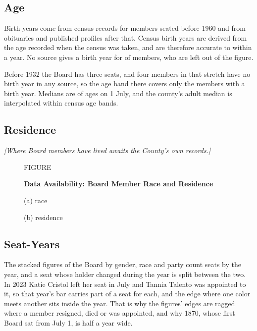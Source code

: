 \subsection{Age}
Birth years come from census records for members seated before 1960 and from obituaries
and published profiles after that. Census birth years are derived from the age recorded when the census was taken, and are therefore accurate to within a year. No source gives a birth year for \birthYearMissingMembers{} of
\membersTotal{} members, who are left out of the figure.

Before 1932 the Board has three seats, and four members in that stretch have no birth year
in any source, so the age band there covers only the members with a birth year.
Medians are of ages on 1 July, and the county's adult median is interpolated within
census age bands.

\subsection{Residence}
\textit{[Where Board members have lived awaits the County's own records.]}

\begin{figure}[p]
  \centering
  \label{fig:board-race-coverage}
  \label{fig:board-residence}
  {\raggedright\MakeUppercase{Figure \thefigure}\par}
  {\raggedright\bfseries Data Availability: Board Member Race and Residence\par}
  \medskip
  {\raggedright (a) race\par}
  \par
  \bigskip
  {\raggedright (b) residence\par}
  \par
  \smallskip
\end{figure}

\subsection{Seat-Years}
The stacked figures of the Board by gender, race and party count seats by the
year, and a seat whose holder changed during the year is split between the two.
In 2023 Katie Cristol left her seat in July and Tannia Talento was appointed to
it, so that year's bar carries part of a seat for each, and the edge where one
color meets another sits inside the year. That is why the figures' edges are ragged
where a member resigned, died or was appointed, and why 1870, whose first Board
sat from July 1, is half a year wide.

